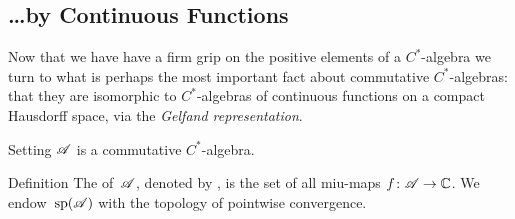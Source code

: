 \documentclass[a]{subfiles}
\begin{document}
\subsection{\dots by Continuous Functions}
\begin{parsec}%
\begin{point}%
Now that we have have a firm grip
on the positive elements of a $C^*$-algebra
we turn to what is perhaps the most important
fact about commutative $C^*$-algebras:
that they are isomorphic to $C^*$-algebras
of continuous functions on a compact Hausdorff space,
via the \emph{Gelfand representation}.
\end{point}
\begin{point}{Setting}%
$\mathscr{A}$ is a commutative $C^*$-algebra.
\end{point}
\begin{point}{Definition}%
The  of~$\mathscr{A}$,%
denoted by \Define{$\spec(\scrA)$},
is the set of all miu-maps $f\colon \mathscr{A}\to \mathbb{C}$.
We endow~$\spec(\scrA)$
with the topology of pointwise convergence.


\end{point}
\end{parsec}
\end{document}
